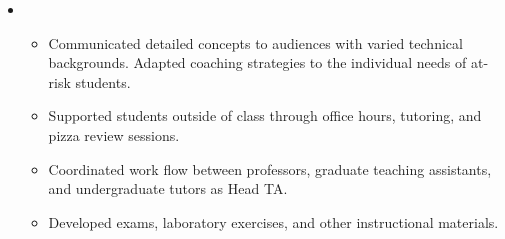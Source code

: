 \begin{itemize}[leftmargin=\parindent]
  \item[]
    \\
    \begin{itemize}
      \item Communicated detailed concepts to audiences with varied technical backgrounds. Adapted coaching strategies to the individual needs of at-risk students. 
      \item Supported students outside of class through office hours, tutoring, and pizza review sessions. 
      \item Coordinated work flow between professors, graduate teaching assistants, and undergraduate tutors as Head TA. 
      \item Developed exams, laboratory exercises, and other instructional materials. 
    \end{itemize}

\end{itemize}





